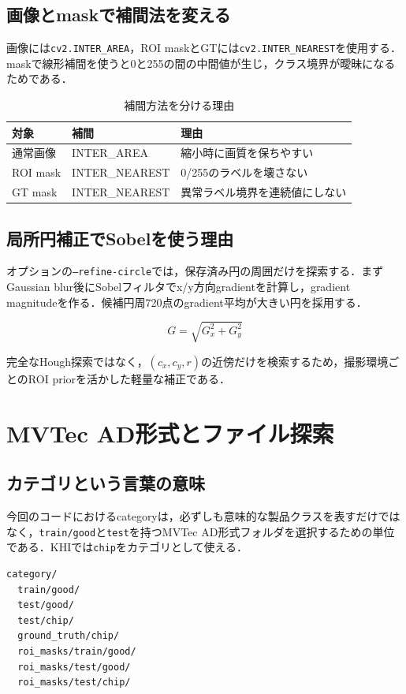 \documentclass[a4paper,11pt]{ltjsreport}
\begin{document}
\section{画像とmaskで補間法を変える}
画像には\texttt{cv2.INTER\_AREA}，ROI maskとGTには\texttt{cv2.INTER\_NEAREST}を使用する．maskで線形補間を使うと0と255の間の中間値が生じ，クラス境界が曖昧になるためである．

\begin{table}[H]
\centering
\caption{補間方法を分ける理由}
\begin{tabularx}{\linewidth}{L{35mm} L{42mm} Y}
\toprule
対象 & 補間 & 理由 \\
\midrule
通常画像 & INTER\_AREA & 縮小時に画質を保ちやすい \\
ROI mask & INTER\_NEAREST & 0/255のラベルを壊さない \\
GT mask & INTER\_NEAREST & 異常ラベル境界を連続値にしない \\
\bottomrule
\end{tabularx}
\end{table}

\section{局所円補正でSobelを使う理由}
オプションの\texttt{--refine-circle}では，保存済み円の周囲だけを探索する．まずGaussian blur後にSobelフィルタでx/y方向gradientを計算し，gradient magnitudeを作る．候補円周720点のgradient平均が大きい円を採用する．

\[
G=\sqrt{G_x^2+G_y^2}
\]

完全なHough探索ではなく，\((c_x,c_y,r)\)の近傍だけを検索するため，撮影環境ごとのROI priorを活かした軽量な補正である．

\chapter{MVTec AD形式とファイル探索}

\section{カテゴリという言葉の意味}
今回のコードにおけるcategoryは，必ずしも意味的な製品クラスを表すだけではなく，\texttt{train/good}と\texttt{test}を持つMVTec AD形式フォルダを選択するための単位である．KHIでは\texttt{chip}をカテゴリとして使える．

\begin{verbatim}
category/
  train/good/
  test/good/
  test/chip/
  ground_truth/chip/
  roi_masks/train/good/
  roi_masks/test/good/
  roi_masks/test/chip/
\end{verbatim}
\end{document}
